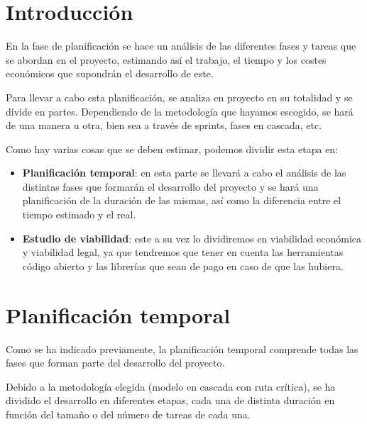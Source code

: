 \section{Introducción}

En la fase de planificación se hace un análisis de las diferentes fases y tareas que
se abordan en el proyecto, estimando así el trabajo, el tiempo y los costes económicos
que supondrán el desarrollo de este.

Para llevar a cabo esta planificación, se analiza en proyecto en su totalidad y se 
divide en partes. Dependiendo de la metodología que hayamos escogido, se hará de una 
manera u otra, bien sea a través de sprints, fases en cascada, etc.

Como hay varias cosas que se deben estimar, podemos dividir esta etapa en:
\begin{itemize}
  \tightlist
  \item\textbf{Planificación temporal}: en esta parte se llevará a cabo el análisis de las distintas
  fases que formarán el desarrollo del proyecto y se hará una planificación de la 
  duración de las mismas, así como la diferencia entre el tiempo estimado y el real.
  \item\textbf{Estudio de viabilidad}: este a su vez lo dividiremos en viabilidad económica y viabilidad legal, ya que tendremos que tener en cuenta las herramientas código abierto y las librerías que sean de pago en caso de que las hubiera.
\end{itemize}

\newpage
\section{Planificación temporal}
Como se ha indicado previamente, la planificación temporal comprende todas las fases que
forman parte del desarrollo del proyecto. 

Debido a la metodología elegida (modelo en cascada con ruta crítica), se ha dividido 
el desarrollo en diferentes etapas, cada una de distinta duración en función del tamaño
o del número de tareas de cada una. 


